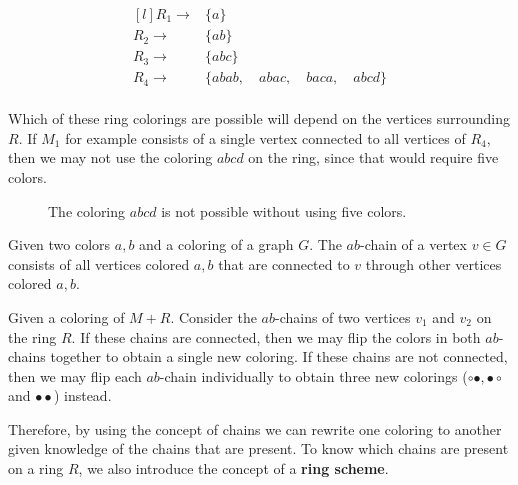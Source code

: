 \begin{equation}
    \begin{matrix*}[l]
        R_1 \rightarrow & \{ a \}\\
        R_2 \rightarrow & \{ ab \} \\
        R_3 \rightarrow & \{ abc \} \\
        R_4 \rightarrow & \{ abab, \quad abac, \quad baca, \quad abcd \}\\
    \end{matrix*}
\end{equation}

Which of these ring colorings are possible will depend on the vertices surrounding $R$. If $M_1$ for example consists of a single vertex connected to all vertices of $R_4$, then we may not use the coloring $abcd$ on the ring, since that would require five colors.

\begin{figure}[!ht]
    \centering
    \caption{The coloring $abcd$ is not possible without using five colors. }
\end{figure}

\begin{definition}
    Given two colors $a,b$ and a coloring of a graph $G$. The $ab$-chain of a vertex $v \in G$ consists of all vertices colored $a,b$ that are connected to $v$ through other vertices colored $a,b$.
\end{definition}

Given a coloring of $M+R$. Consider the $ab$-chains of two vertices $v_1$ and $v_2$ on the ring $R$. If these chains are connected, then we may flip the colors in both $ab$-chains together to obtain a single new coloring. If these chains are not connected, then we may flip each $ab$-chain individually to obtain three new colorings ($\circ \bullet, \bullet \circ$ and $ \bullet \bullet$) instead.

Therefore, by using the concept of chains we can rewrite one coloring to another given knowledge of the chains that are present. To know which chains are present on a ring $R$, we also introduce the concept of a \textbf{ring scheme}.

